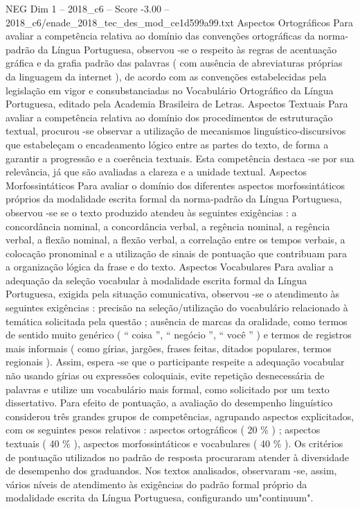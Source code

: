 \begin{textsample}{NEG Dim 1 – 2018\_c6 – Score -3.00 – 2018\_c6/enade\_2018\_tec\_des\_mod\_ce1d599a99.txt}
Aspectos Ortográficos Para avaliar a competência relativa ao domínio das convenções ortográficas da norma-padrão da Língua Portuguesa, observou -se o respeito às regras de acentuação gráfica e da grafia padrão das palavras ( com ausência de abreviaturas próprias da linguagem da internet ), de acordo com as convenções estabelecidas pela legislação em vigor e consubstanciadas no Vocabulário Ortográfico da Língua Portuguesa, editado pela Academia Brasileira de Letras.
Aspectos Textuais Para avaliar a competência relativa ao domínio dos procedimentos de estruturação textual, procurou -se observar a utilização de mecanismos linguístico-discursivos que estabeleçam o encadeamento lógico entre as partes do texto, de forma a garantir a progressão e a coerência textuais.
Esta competência destaca -se por sua relevância, já que são avaliadas a clareza e a unidade textual.
Aspectos Morfossintáticos Para avaliar o domínio dos diferentes aspectos morfossintáticos próprios da modalidade escrita formal da norma-padrão da Língua Portuguesa, observou -se se o texto produzido atendeu às seguintes exigências : a concordância nominal, a concordância verbal, a regência nominal, a regência verbal, a flexão nominal, a flexão verbal, a correlação entre os tempos verbais, a colocação pronominal e a utilização de sinais de pontuação que contribuam para a organização lógica da frase e do texto.
Aspectos Vocabulares Para avaliar a adequação da seleção vocabular à modalidade escrita formal da Língua Portuguesa, exigida pela situação comunicativa, observou -se o atendimento às seguintes exigências : precisão na seleção/utilização do vocabulário relacionado à temática solicitada pela questão ; ausência de marcas da oralidade, como termos de sentido muito genérico ( “ coisa ”, “ negócio ”, “ você ” ) e termos de registros mais informais ( como gírias, jargões, frases feitas, ditados populares, termos regionais ).
Assim, espera -se que o participante respeite a adequação vocabular não usando gírias ou expressões coloquiais, evite repetição desnecessária de palavras e utilize um vocabulário mais formal, como solicitado por um texto dissertativo.
Para efeito de pontuação, a avaliação do desempenho linguístico considerou três grandes grupos de competências, agrupando aspectos explicitados, com os seguintes pesos relativos : aspectos ortográficos ( 20 \% ) ; aspectos textuais ( 40 \% ), aspectos morfossintáticos e vocabulares ( 40 \% ).
Os critérios de pontuação utilizados no padrão de resposta procuraram atender à diversidade de desempenho dos graduandos.
Nos textos analisados, observaram -se, assim, vários níveis de atendimento às exigências do padrão formal próprio da modalidade escrita da Língua Portuguesa, configurando um"continuum".

\end{textsample}
